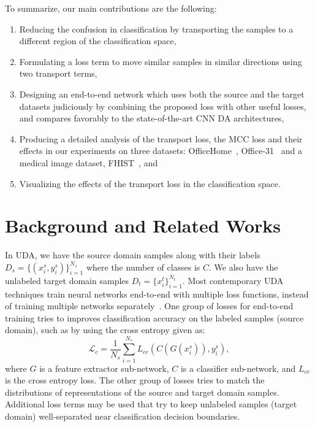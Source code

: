 \documentclass[10pt,twocolumn,letterpaper]{article}
\begin{document}
To summarize, our main contributions are the following:
\begin{enumerate}
    \item Reducing the confusion in classification by transporting the samples to a different region of the classification space,
    \item Formulating a loss term to move similar samples in similar directions using two transport terms,
    \item Designing an end-to-end network which uses both the source and the target datasets judiciously by combining the proposed loss with other useful losses, and compares favorably to the state-of-the-art CNN DA architectures,
    \item Producing a detailed analysis of the transport loss, the MCC loss \cite{mcc} and their effects in our experiments on three datasets: OfficeHome~\cite{office-home}, Office-31~\cite{office31} and a medical image dataset, FHIST~\cite{fhist}, and
    \item Visualizing the effects of the transport loss in the classification space.
\end{enumerate}





\section{Background and Related Works}

In UDA, we have the source domain samples along with their labels $D_s = \{(x_i^s,y_i^s)\}_{i=1}^{N_s}$ where the number of classes is $C$. We also have the unlabeled target domain samples $D_t = \{x_i^t\}_{i=1}^{N_t}$. Most contemporary UDA techniques train neural networks end-to-end with multiple loss functions, instead of training multiple networks separately~\cite{mmd,homm,deepcoral,dcan,cdan,srdc}. One group of losses for end-to-end training tries to improves classification accuracy on the labeled samples (source domain), such as by using the cross entropy given as: 
\begin{equation}
    \mathcal{L}_{c} = \frac{1}{N_s} \sum_{i=1}^{N_s}L_{ce}(C(G(x_i^s)),y_i^s),
\end{equation}
where $G$ is a feature extractor sub-network, $C$ is a classifier sub-network, and $L_{ce}$ is the cross entropy loss. The other group of losses tries to match the distributions of representations of the source and target domain samples. Additional loss terms may be used that try to keep unlabeled samples (target domain) well-separated near classification decision boundaries.
\end{document}
